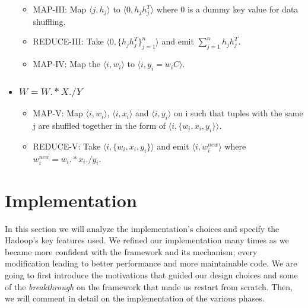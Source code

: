 \documentclass[a4paper,12pt]{article}
\begin{document}
\begin{itemize}
       \begin{itemize}

         \item MAP-III: Map $\langle j, h_j \rangle$ to  $\langle 0,
           h_j h_j^T \rangle$ where 0 is a dummy key value for data
           shuffling.

          \item REDUCE-III: Take $\langle 0, \{h_j h_j^T\}_{j=1}^{n}
            \rangle $ and emit $\sum_{j=1}^{n} h_j h_j^T $.

         \item MAP-IV: Map the $ \langle i, w_i \rangle$ to $ \langle
           i, y_i = w_iC \rangle$.

       \end{itemize}


      \item \subsubsection{$ W = W .* X ./ Y $}
        \begin{itemize}

         \item MAP-V: Map $\langle i, w_i \rangle$, $\langle i, x_i
           \rangle$ and $\langle i, y_i \rangle$ on i such that tuples
           with the same j are shuffled together in the form of
           $\langle i, \{w_i, x_i, y_i\} \rangle$.

          \item REDUCE-V: Take $\langle i, \{w_i, x_i, y_i\} \rangle$
            and emit $\langle i, w_i^{new} \rangle$ where $w_i^{new} =
            w_i .* x_i ./ y_i $.

       \end{itemize}

    \end{itemize}

\section{Implementation}
\label{sec:implementation}

In this section we will analyze the implementation's choices and specify the Hadoop's key features used. 
We refined our implementation many times as we became more confident with the framework and its mechanism; every modification leading to better performance and more maintainable code.
We are going to first introduce the motivations that guided our design choices and some of the \textit{breakthrough} on the framework that made us restart from scratch.
Then, we will comment in detail on the implementation of the various phases.
\end{document}
